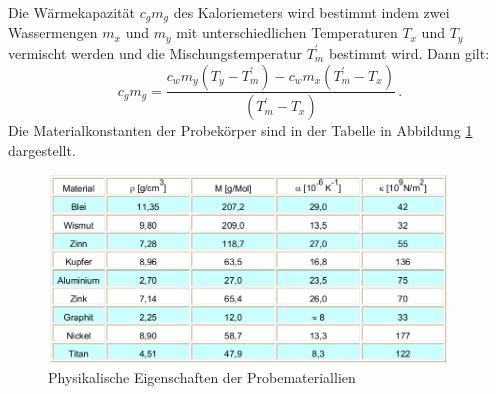 Die Wärmekapazität $c_g m_g$ des Kaloriemeters wird bestimmt indem zwei
Wassermengen $ m_x $ und $m_y$ mit unterschiedlichen Temperaturen $T_x$ und
$T_y$ vermischt werden und die Mischungstemperatur $T_m ^{'}$ bestimmt wird.
Dann gilt:
\begin{equation}
  c_gm_g = \frac{c_w m_y (T_y - T_m ^{'})- c_w m_x (T_m ^{'} - T_x)}{(T_m ^{'} - T_x)} \, .
\end{equation}
Die Materialkonstanten der Probekörper sind in der Tabelle in
Abbildung \ref{fig:tab} dargestellt.
\begin{figure}
  \centering
  \includegraphics[height=5cm]{logos/tab.png}
  \caption{Physikalische Eigenschaften der Probemateriallien \cite{Anleitung}}
  \label{fig:tab}
\end{figure}



























%
